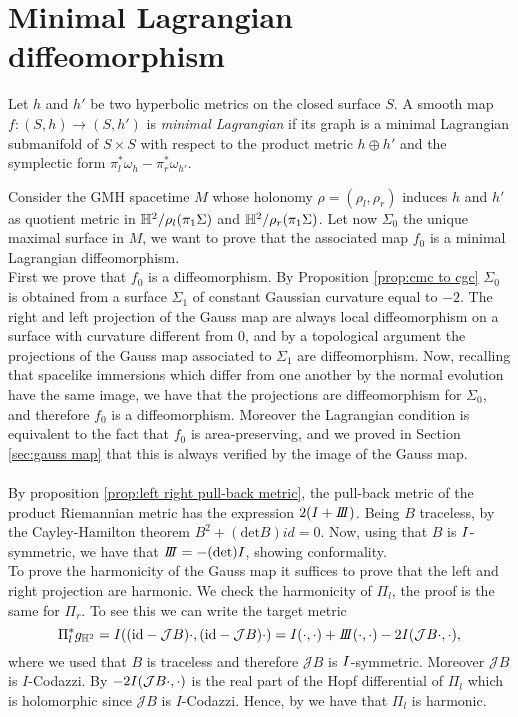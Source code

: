 \section{Minimal Lagrangian diffeomorphism}

\begin{definition}
    Let $h$ and $h'$ be two hyperbolic metrics on the closed surface $S$. A smooth map $f: (S,h) \to (S,h')$ is \textit{minimal Lagrangian} if its graph is a minimal Lagrangian submanifold of $S\times S$ with respect to the product metric $h \oplus h'$ and the symplectic form $\pi_l^*\omega_h - \pi_r^* \omega_{h'}$. 
\end{definition}

\red{|||}
Consider the GMH spacetime $M$ whose holonomy $\rho = (\rho_l, \rho_r)$ induces $h$ and $h'$ as quotient metric in $\mathbb{H}^2 / \rho_l(\pi_1 \Sigma)$ and $\mathbb{H}^2 / \rho_r(\pi_1 \Sigma)$. Let now $\Sigma_0$ the unique maximal surface in $M$, we want to prove that the associated map $f_0$ is a minimal Lagrangian diffeomorphism.\\
First we prove that $f_0$ is a diffeomorphism. By Proposition \ref{prop:cmc to cgc} $\Sigma_0$ is obtained from a surface $\Sigma_1$ of constant Gaussian curvature equal to $-2$. The right and left projection of the Gauss map are always local diffeomorphism on a surface with curvature different from $0$, and by a topological argument the projections of the Gauss map associated to $\Sigma_1$ are diffeomorphism. Now, recalling that spacelike immersions which differ from one another by the normal evolution have the same image, we have that the projections are diffeomorphism for $\Sigma_0$, and therefore $f_0$ is a diffeomorphism. Moreover the Lagrangian condition is equivalent to the fact that $f_0$ is area-preserving, and we proved in Section \ref{sec:gauss map} that this is always verified by the image of the Gauss map.\\
\\
By proposition \ref{prop:left right pull-back metric}, the pull-back metric of the product Riemannian metric has the expression $2(\I + \III)$. Being $B$ traceless, by the Cayley-Hamilton theorem $B^2 + (\text{det}B)id = 0$. Now, using that $B$ is $I$-symmetric, we have that $\III = -(\text{det})I$, showing conformality.\\
To prove the harmonicity of the Gauss map it suffices to prove that the left and right projection are harmonic. We check the harmonicity of $\Pi_l$, the proof is the same for $\Pi_r$. To see this we can write the target metric
\[
    \Pi_l^*g_{\H^2}=I((\text{id}-\mathcal{J}B)\cdot,(\text{id}-\mathcal{J}B)\cdot) = \I(\cdot, \cdot) + \III(\cdot, \cdot) - 2\I(\mathcal{J}B \cdot, \cdot),
\]
where we used that $B$ is traceless and therefore $\mathcal{J}B$ is $I$-symmetric. Moreover $\mathcal{J} B$ is $I$-Codazzi. By  $- 2I(\mathcal{J}B \cdot, \cdot)$ is the real part of the Hopf differential of $\Pi_l$ which is holomorphic since $\mathcal{J}B$ is $I$-Codazzi. Hence, by  we have that $\Pi_l$ is harmonic.
\red{|||}
